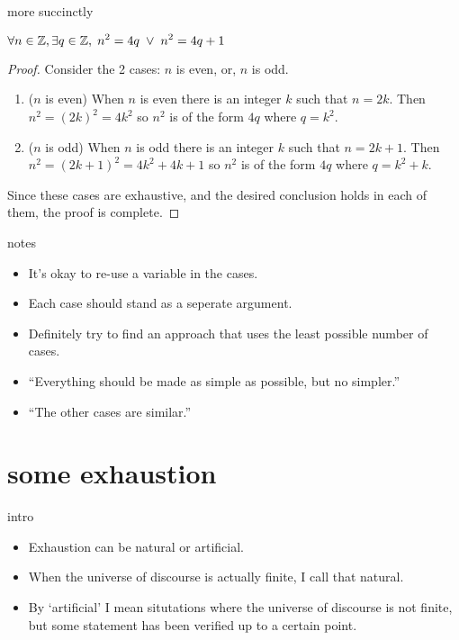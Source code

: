 \documentclass[landscape]{beamer}
\begin{document}
\begin{frame}{more succinctly}
\begin{thm*}
$\displaystyle \forall n \in {\mathbb Z}, \exists q \in {\mathbb Z}, \; n^2 = 4q \; \lor \; n^2 = 4q+1$
\end{thm*}
\pause
\begin{proof} 
Consider the 2 cases: $n$ is even, or, $n$ is odd.\pause
\begin{enumerate}
\item ($n$ is even) When $n$ is even there is an integer $k$ such that $n=2k$.  Then $n^2=(2k)^2=4k^2$ so $n^2$ is of the form $4q$ where $q=k^2$. \pause
\item ($n$ is odd) When $n$ is odd there is an integer $k$ such that $n=2k+1$.  Then $n^2=(2k+1)^2=4k^2+4k+1$ so $n^2$ is of the form $4q$ where $q=k^2+k$. \pause
\end{enumerate}
Since these cases are exhaustive, and the desired conclusion holds in each of them, the proof is complete.
\end{proof}
\end{frame}

\begin{frame}{notes}
\begin{itemize}
\item It's okay to re-use a variable in the cases. \pause
\item Each case should stand as a seperate argument. \pause
\item Definitely try to find an approach that uses the least possible number of cases. \pause
\item ``Everything should be made as simple as possible, but no simpler.'' \pause
\item ``The other cases are similar.''
\end{itemize}
\end{frame}


\section{some exhaustion}

\begin{frame}{intro}
\begin{itemize}
\item Exhaustion can be natural or artificial. \pause
\item When the universe of discourse is actually finite, I call that natural. \pause
\item By `artificial' I mean situtations where the universe of discourse is not finite, but some statement has been 
verified up to a certain point. \pause
\end{itemize}
\end{frame}
\end{document}
